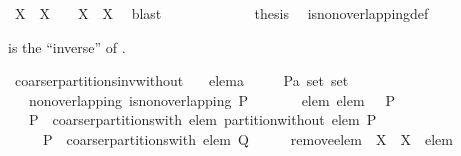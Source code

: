 \begin{isabellebody}
\ {\isachardoublequoteopen}{\isacharparenleft}X{}\ {\isasyminter}\ X{}\ {\isasymnoteq}\ {\isacharbraceleft}{\isacharbraceright}{\isacharparenright}\ {\isasymlongleftrightarrow}\ X{}\ {\isacharequal}\ X{}{\isachardoublequoteclose}\ \isamarkupfalse%
\ blast\isanewline
\ \ \ \ \isamarkupfalse%
\isanewline
\ \ \isamarkupfalse%
\isanewline
\ \ \isamarkupfalse%
\ \isamarkupfalse%
\ {\isacharquery}thesis\ \isamarkupfalse%
\ is{\isacharunderscore}non{\isacharunderscore}overlapping{\isacharunderscore}def\ \isacommand{{\isachardot}}\isamarkupfalse%
\isanewline
{}\isamarkupfalse%
%
\endisatagproof
{\isafoldproof}%
%
\isadelimproof
%
\endisadelimproof
%
\begin{isamarkuptext}%
 is the ``inverse'' of 
  .%
\end{isamarkuptext}%
\isamarkuptrue%
\isamarkupfalse%
\ coarser{\isacharunderscore}partitions{\isacharunderscore}inv{\isacharunderscore}without{\isacharcolon}\isanewline
\ \ \ elem{\isacharcolon}{\isacharcolon}{\isacharprime}a\isanewline
\ \ \ \ \ P{\isacharcolon}{\isacharcolon}{\isachardoublequoteopen}{\isacharprime}a\ set\ set{\isachardoublequoteclose}\isanewline
\ \ \ non{\isacharunderscore}overlapping{\isacharcolon}\ {\isachardoublequoteopen}is{\isacharunderscore}non{\isacharunderscore}overlapping\ P{\isachardoublequoteclose}\isanewline
\ \ \ \ \ \ \ elem{\isacharcolon}\ {\isachardoublequoteopen}elem\ {\isasymin}\ {\isasymUnion}\ P{\isachardoublequoteclose}\ \isanewline
\ \ \ {\isachardoublequoteopen}P\ {\isasymin}\ coarser{\isacharunderscore}partitions{\isacharunderscore}with\ elem\ {\isacharparenleft}partition{\isacharunderscore}without\ elem\ P{\isacharparenright}{\isachardoublequoteclose}\isanewline
\ \ \ \ {\isacharparenleft}\ {\isachardoublequoteopen}P\ {\isasymin}\ coarser{\isacharunderscore}partitions{\isacharunderscore}with\ elem\ {\isacharquery}Q{\isachardoublequoteclose}{\isacharparenright}\isanewline
%
\isadelimproof
%
\endisadelimproof
%
\isatagproof
{}\isamarkupfalse%
\ {\isacharminus}\isanewline
\ \ \isamarkupfalse%
\ {\isacharquery}remove{\isacharunderscore}elem\ {\isacharequal}\ {\isachardoublequoteopen}{\isasymlambda}X\ {\isachardot}\ X\ {\isacharminus}\ {\isacharbraceleft}elem{\isacharbraceright}{\isachardoublequoteclose}\ \isanewline

\end{isabellebody}
